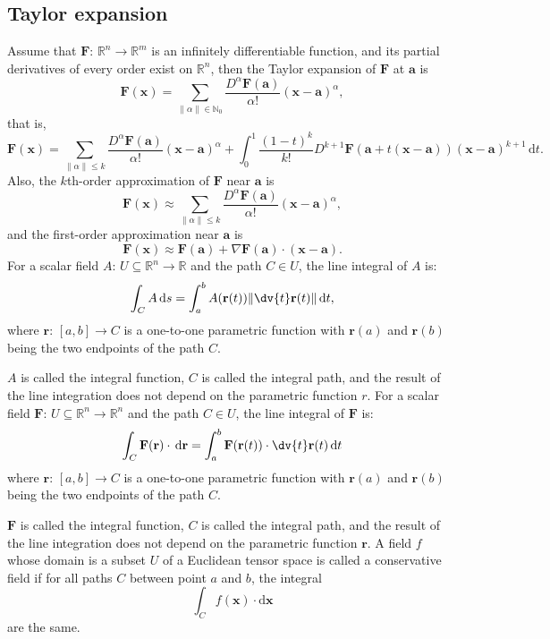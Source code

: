 \documentclass[a4paper,12pt]{report}
\begin{document}
{{{{{{{{{{{{\subsection{Taylor expansion}
Assume that $\mathbf{F}:\,\mathbb{R}^n\to\mathbb{R}^m$ is an infinitely differentiable function, and its partial derivatives of every order exist on $\mathbb{R}^n$, then the Taylor expansion of $\mathbf{F}$ at $\mathbf{a}$ is
\[\mathbf{F}(\mathbf{x}) = \sum_{\|\alpha\|\in\mathbb{N}_0} \frac{D^\alpha \mathbf{F}(\mathbf{a})}{\alpha!} (\mathbf{x} - \mathbf{a})^\alpha,\]
that is,
\[\mathbf{F}(\mathbf{x}) = \sum_{\|\alpha\|\leq k} \frac{D^\alpha \mathbf{F}(\mathbf{a})}{\alpha!} (\mathbf{x} - \mathbf{a})^\alpha+\int_0^1\frac{(1-t)^k}{k!} D^{k+1}\mathbf{F}(\mathbf{a} + t(\mathbf{x} - \mathbf{a})) (\mathbf{x} - \mathbf{a})^{k+1} \, \mathrm{d}t.\]
Also, the $k$th-order approximation of $\mathbf{F}$ near $\mathbf{a}$ is
\[\mathbf{F}(\mathbf{x}) \approx \sum_{\|\alpha\|\leq k} \frac{D^\alpha \mathbf{F}(\mathbf{a})}{\alpha!} (\mathbf{x} - \mathbf{a})^\alpha,\]
and the first-order approximation near $\mathbf{a}$ is
\[\mathbf{F}(\mathbf{x}) \approx \mathbf{F}(\mathbf{a}) + \nabla \mathbf{F}(\mathbf{a}) \cdot (\mathbf{x} - \mathbf{a}).\]
For a scalar field $A : \,U\subseteq \mathbb {R} ^{n}\to \mathbb {R}$ and the path $C \in U$, the line integral of $A$ is: 
\[\int _{C}A\,\mathrm {d} s=\int _{a}^{b}A(\mathbf{r}(t))\|\dv{t}\mathbf {r} (t)\|\,\mathrm {d} t,\]
where $\mathbf{r}:\, [a, b] \to C$ is a one-to-one parametric function with $\mathbf{r}(a)$ and $\mathbf{r}(b)$ being the two endpoints of the path $C$. 

$A$ is called the integral function, $C$ is called the integral path, and the result of the line integration does not depend on the parametric function $r$.
For a scalar field $\mathbf{F}: \,U\subseteq \mathbb {R} ^{n}\to \mathbb {R}^n$ and the path $C \in U$, the line integral of $\mathbf{F}$ is: 
\[\int _{C}\mathbf {F} (\mathbf {r} )\cdot \,\mathrm {d} \mathbf{r}=\int _{a}^{b}\mathbf {F} (\mathbf {r} (t))\cdot \dv{t}\mathbf {r} (t)\,\mathrm {d} t\]
where $\mathbf{r}:\, [a, b] \to C$ is a one-to-one parametric function with $\mathbf{r}(a)$ and $\mathbf{r}(b)$ being the two endpoints of the path $C$. 

$\mathbf{F}$ is called the integral function, $C$ is called the integral path, and the result of the line integration does not depend on the parametric function $\mathbf{r}$.
A field $f$ whose domain is a subset $U$ of a Euclidean tensor space is called a conservative field if for all paths $C$ between point $a$ and $b$, the integral 
\[\int_Cf(\mathbf{x})\cdot\mathrm{d}\mathbf{x}\]
are the same.

}}}}}}}}}}}}
\end{document}
